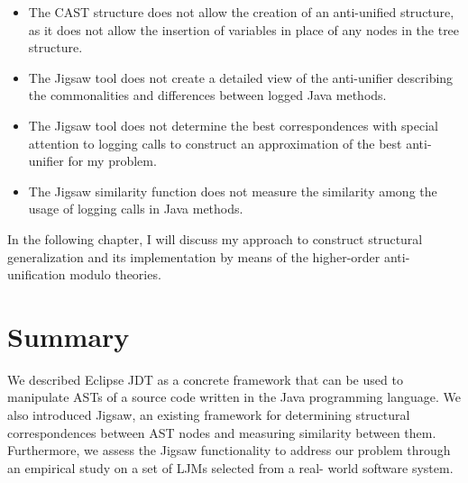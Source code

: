 \begin{itemize} [leftmargin=.5in]
\item The CAST structure does not allow the creation of an anti-unified structure, as it does not allow the insertion of variables in place of any nodes in the tree structure.
\item The Jigsaw tool does not create a detailed view of the anti-unifier describing the commonalities and differences between logged Java methods.
\item The Jigsaw tool does not determine the best correspondences with special attention to logging calls to construct an approximation of the best anti-unifier for my problem.
\item The Jigsaw similarity function does not measure the similarity among the usage of logging calls in Java methods.
\end{itemize}

In the following chapter, I will discuss my approach to construct structural generalization and its implementation by means of the higher-order anti-unification modulo theories.

\section{Summary}  \label{summary}
We described Eclipse JDT as a concrete framework that can be used  to manipulate ASTs of a source code written in the Java programming language. We also introduced Jigsaw, an existing framework for determining structural correspondences between AST nodes and measuring similarity between them. Furthermore, we assess the Jigsaw functionality to address our problem through an empirical study on a set of LJMs selected from a real- world software system.





